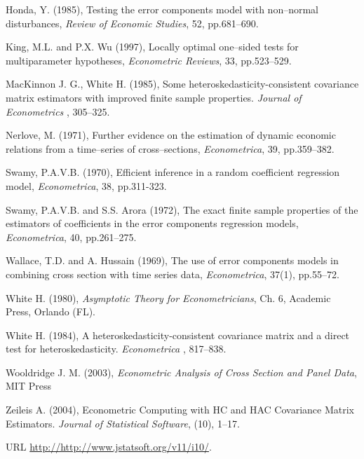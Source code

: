 \documentclass{article}
\begin{document}
  Honda, Y. (1985), Testing the error components model with non--normal
  disturbances, \emph{Review of Economic Studies}, 52, pp.681--690.

  King, M.L. and P.X. Wu (1997), Locally optimal one--sided tests for
  multiparameter hypotheses, \emph{Econometric Reviews}, 33,
  pp.523--529.

  MacKinnon J. G., White H. (1985), Some heteroskedasticity-consistent
covariance matrix estimators with improved finite sample properties.
\emph{Journal of Econometrics} , 305--325.

  Nerlove, M. (1971), Further evidence on the estimation of dynamic
  economic relations from a time--series of cross--sections,
  \emph{Econometrica}, 39, pp.359--382.

  Swamy, P.A.V.B. (1970), Efficient inference in a random coefficient
  regression model, \emph{Econometrica}, 38, pp.311-323.

  
  Swamy, P.A.V.B. and S.S. Arora (1972), The exact finite sample
  properties of the estimators of coefficients in the error components
  regression models, \emph{Econometrica}, 40, pp.261--275.

  Wallace, T.D. and A. Hussain (1969), The use of error components
  models in combining cross section with time series data,
  \emph{Econometrica}, 37(1), pp.55--72.

  White H. (1980), \emph{Asymptotic Theory for Econometricians}, Ch. 6, Academic Press, Orlando (FL).

  White H. (1984), A heteroskedasticity-consistent covariance matrix and
a direct test for heteroskedasticity. \emph{Econometrica} ,
817--838.

  Wooldridge J. M. (2003), \emph{Econometric Analysis of Cross Section and Panel Data}, MIT Press

  Zeileis A. (2004), Econometric Computing with HC and HAC Covariance Matrix
Estimators. \emph{Journal of Statistical Software}, (10), 1--17.

URL \url{http://http://www.jstatsoft.org/v11/i10/}.
\end{document}
